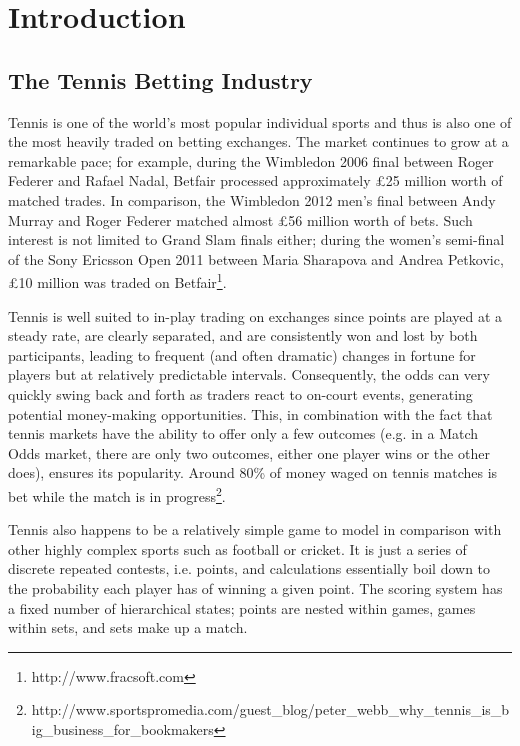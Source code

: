 \documentclass[letterpaper,12pt]{article}
\begin{document}

\section{Introduction}

\subsection{The Tennis Betting Industry}

Tennis is one of the world's most popular individual sports and thus is also one of the most heavily traded on betting exchanges.  The market continues to grow at a remarkable pace; for example, during the Wimbledon 2006 final between Roger Federer and Rafael Nadal, Betfair processed approximately \pounds25 million worth of matched trades.  In comparison, the Wimbledon 2012 men's final between Andy Murray and Roger Federer matched almost \pounds56 million worth of bets.  Such interest is not limited to Grand Slam finals either; during the women's semi-final of the Sony Ericsson Open 2011 between Maria Sharapova and Andrea Petkovic, \pounds10 million was traded on Betfair\footnote{http://www.fracsoft.com}.

Tennis is well suited to in-play trading on exchanges since points are played at a steady rate, are clearly separated, and are consistently won and lost by both participants, leading to frequent (and often dramatic) changes in fortune for players but at relatively predictable intervals.  Consequently, the odds can very quickly swing back and forth as traders react to on-court events, generating potential money-making opportunities.  This, in combination with the fact that tennis markets have the ability to offer only a few outcomes (e.g. in a Match Odds market, there are only two outcomes, either one player wins or the other does), ensures its popularity.  Around 80\% of money waged on tennis matches is bet while the match is in progress\footnote{http://www.sportspromedia.com/guest\_blog/peter\_webb\_why\_tennis\_is\_big\_business\_for\_bookmakers}.

Tennis also happens to be a relatively simple game to model in comparison with other highly complex sports such as football or cricket.  It is just a series of discrete repeated contests, i.e. points, and calculations essentially boil down to the probability each player has of winning a given point.  The scoring system has a fixed number of hierarchical states; points are nested within games, games within sets, and sets make up a match.
\end{document}
